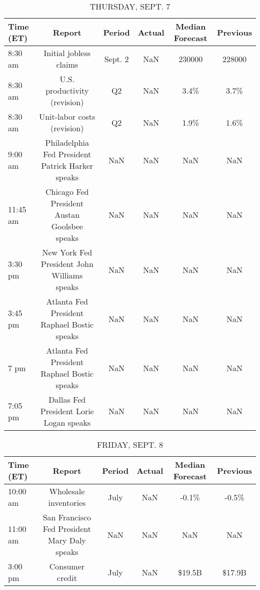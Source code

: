 \documentclass{article}%
\begin{document}
%


\begin{table}[htbp]%
\caption{THURSDAY, SEPT. 7}%
\centering%
\begin{adjustbox}{width=1\textwidth}%
\begin{tabular}{lccccc}
\toprule
Time (ET) &                                           Report &  Period & Actual & Median Forecast & Previous \\
\midrule
  8:30 am &                           Initial jobless claims & Sept. 2 &    NaN &          230000 &   228000 \\
  8:30 am &                     U.S. productivity (revision) &      Q2 &    NaN &            3.4\% &     3.7\% \\
  8:30 am &                      Unit-labor costs (revision) &      Q2 &    NaN &            1.9\% &     1.6\% \\
  9:00 am & Philadelphia Fed President Patrick Harker speaks &     NaN &    NaN &             NaN &      NaN \\
 11:45 am &     Chicago Fed President Austan Goolsbee speaks &     NaN &    NaN &             NaN &      NaN \\
  3:30 pm &      New York Fed President John Williams speaks &     NaN &    NaN &             NaN &      NaN \\
  3:45 pm &      Atlanta Fed President Raphael Bostic speaks &     NaN &    NaN &             NaN &      NaN \\
     7 pm &      Atlanta Fed President Raphael Bostic speaks &     NaN &    NaN &             NaN &      NaN \\
  7:05 pm &          Dallas Fed President Lorie Logan speaks &     NaN &    NaN &             NaN &      NaN \\
\bottomrule
\end{tabular}
%
\end{adjustbox}%
\end{table}

%


\begin{table}[htbp]%
\caption{FRIDAY, SEPT. 8}%
\centering%
\begin{adjustbox}{width=1\textwidth}%
\begin{tabular}{lccccc}
\toprule
Time (ET) &                                       Report & Period & Actual & Median Forecast & Previous \\
\midrule
 10:00 am &                        Wholesale inventories &   July &    NaN &           -0.1\% &    -0.5\% \\
 11:00 am & San Francisco Fed President Mary Daly speaks &    NaN &    NaN &             NaN &      NaN \\
  3:00 pm &                              Consumer credit &   July &    NaN &          \$19.5B &   \$17.9B \\
\bottomrule
\end{tabular}
%
\end{adjustbox}%
\end{table}
\end{document}
